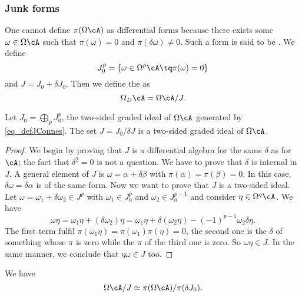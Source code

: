 \subsubsection{Junk forms}

One cannot define $\pi(\Omega\cA)$ as differential forms because there exists some $\omega\in\Omega\cA$ such that $\pi(\omega)=0$ and $\pi(\delta\omega)\neq 0$. Such a form is said to be . We define
\begin{equation}  \label{eq_defJConnes}
	J_0^p=\{ \omega\in\Omega^p\cA\tq \pi(\omega)=0 \}
\end{equation}
and $J=J_0+\delta J_0$. Then we define the  as
\begin{equation}
	\Omega_D\cA=\Omega\cA/J.
\end{equation}

\begin{proposition}
	Let $J_0=\bigoplus_pJ_0^p$, the two-sided graded ideal of $\Omega\cA$ generated by \eqref{eq_defJConnes}.  The set $J=J_0/\delta J$ is a two-sided graded ideal of $\Omega\cA$.
\end{proposition}

\begin{proof}
	We begin by proving that $J$ is a differential algebra for the same $\delta$ as for $\cA$; the fact that $\delta^2=0$ is not a question. We have to prove that $\delta$ is internal in $J$. A general element of $J$ is $\omega=\alpha+\delta\beta$ with $\pi(\alpha)=\pi(\beta)=0$. In this case, $\delta\omega=\delta\alpha$ is of the same form. Now we want to prove that $J$ is a two-sided ideal. Let $\omega=\omega_1+\delta\omega_2\in J^p$ with $\omega_1\in J_0^p$ and $\omega_2\in J_0^{p-1}$ and consider $\eta\in\Omega^q\cA$. We have
	\[
		\omega\eta=\omega_1\eta+(\delta\omega_2)\eta
		=\omega_1\eta+\delta(\omega_2\eta)-(-1)^{p-1}\omega_2\delta\eta.
	\]
	The first term fulfil $\pi(\omega_1\eta)=\pi(\omega_1)\pi(\eta)=0$, the second one is the $\delta$ of something whose $\pi$ is zero  while the $\pi$ of the third one is zero. So $\omega\eta\in J$. In the same manner, we conclude that $\eta\omega\in J$ too.
\end{proof}

\begin{lemma}
	We have
	\begin{equation}
		\Omega\cA/J\simeq \pi(\Omega\cA)/\pi(\delta J_0).
	\end{equation}
	\label{lem_OCAisomppiOA}
\end{lemma}

